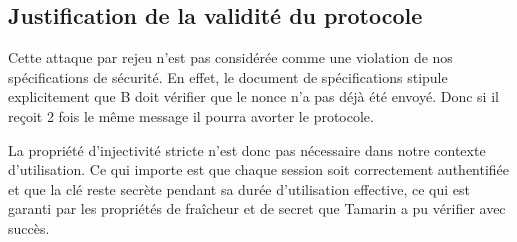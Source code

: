 \subsection{Justification de la validité du protocole}

Cette attaque par rejeu n'est pas considérée comme une violation de nos spécifications de
sécurité. En effet, le document de spécifications stipule explicitement que B doit vérifier
que le nonce n'a pas déjà été envoyé. Donc si il reçoit 2 fois le même message il pourra avorter
le protocole.

La propriété d'injectivité stricte n'est donc pas nécessaire dans notre contexte d'utilisation.
Ce qui importe est que chaque session soit correctement authentifiée et que la clé reste secrète
pendant sa durée d'utilisation effective, ce qui est garanti par les propriétés de fraîcheur et
de secret que Tamarin a pu vérifier avec succès.